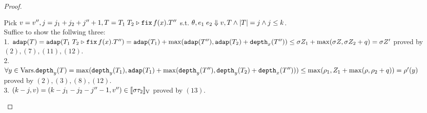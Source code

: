 \documentclass[a4paper,11pt]{article}
\theoremstyle{definition}
\begin{document}
\begin{proof}
\begin{mainitem}
\[{  }
\]
Pick $v = v'', j = j_1 + j_2 + j'' + 1, T =
T_1 \; T_2 \mathrel{\triangleright} {\mathop{\mathtt{fix}} f(x).T''}$ s.t. $ \theta, e_1 \; e_2
\mathrel{\Downarrow} v, T  \land |T| = j \land j \leq k $.  \\
Suffice to show the follwing three:\\
%
1. $\adap(\tr) = \adap(\trapp{\tr_1}{\tr_2}{f}{x}{\tr''}) =
\adap(\tr_1) + \max(\adap(\tr''), \adap(\tr_2) + \ddep{x}(\tr'')) \leq
%
\ienv \nnatA_1 + \max(\ienv \nnatA, \ienv \nnatA_2 + \nnatbiA) = \ienv \nnatA'$ proved by $(2),(7),(11),(12)$.\\
%
2. $\forall y \in \mbox{Vars}. \mathtt{depth}_{y}(T) = \max(\mathtt{depth}_{y}(T_1), \mathtt{adap}(T_1) +
\max(\mathtt{depth}_{y}(T''), \mathtt{depth}_{y}(T_2) + \mathtt{depth}_{x}(T''))) \leq
\max(\rho_1, Z_1 + \max(\rho, \rho_2 + q)) = \rho'(y)$
proved by $(2),(3),(8),(12)$. \\
%
3. $(k - j, v) = (k - j_1 - j_2 - j''-1, v'') \in
[\![ \sigma \tau_2 ]\!]_{\text{V}}$ proved by $(13)$.\\
%



\end{mainitem}
\end{proof}
\end{document}
